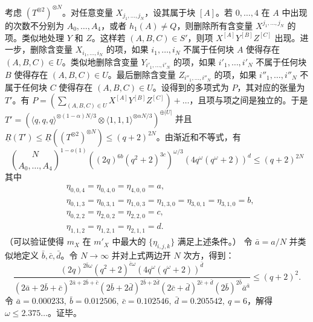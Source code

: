 \documentclass[11pt,fleqn, UTF8]{ctexbook} %
\begin{document}
考虑 $\left(T^{\otimes 2}\right)^{\otimes N}$。对任意变量 $X_{j_1,\dots,j_N}$，设其属于块 $[A]$。若 $0,\dots,4$ 在 $A$ 中出现的次数不分别为 $A_0,\dots,A_4$，或者 $h_1(A)\neq Q$，则删除所有含变量 $X^{j_1,\dots,j_N}$ 的项。类似地处理 $Y$ 和 $Z$。这样若 $(A,B,C)\in S'$，则项 $X^{[A]}Y^{[B]}Z^{[C]}$ 出现。进一步，删除含变量 $X_{i_1,\dots,i_N}$ 的项，如果 ${i_1,\dots,i_N}$ 不属于任何块 $A$ 使得存在 $(A,B,C)\in U$。类似地删除含变量 $Y_{i'_1,\dots,i'_N}$ 的项，如果 ${i'_1,\dots,i'_N}$ 不属于任何块 $B$ 使得存在 $(A,B,C)\in U$。最后删除含变量 $Z_{i''_1,\dots,i''_N}$ 的项，如果 ${i''_1,\dots,i''_N}$ 不属于任何块 $C$ 使得存在 $(A,B,C)\in U$。设得到的多项式为 $P$，其对应的张量为 $T'$。有 $P=\left(\sum_{(A,B,C)\in U} X^{[A]}Y^{[B]}Z^{[C]}\right)+\dots$，且项与项之间是独立的。于是 $T'=\left(\langle q,q,q\rangle^{\otimes (1-\alpha)N/3}\otimes \langle 1,1,1\rangle^{\otimes \alpha N/3}\right)^{\oplus |U|}$ 并且 $\underline{R}(T')\leq \underline{R}\left(\left(T^{\otimes 2}\right)^{\otimes N}\right)\leq (q+2)^{2N}$。由渐近和不等式，有
$$
{N\choose A_0,\dots,A_4}^{1-o(1)}\left((2q)^{6b}(q^2+2)^{3c}\right)^{\omega/3}(4q^\omega(q^\omega+2))^d \leq (q+2)^{2N}
$$
其中
\begin{align}
&\eta_{0,0,4}=\eta_{0,4,0}=\eta_{4,0,0}=a,\\
&\eta_{0,1,3}=\eta_{0,3,1}=\eta_{1,0,3}=\eta_{1,3,0}=\eta_{3,0,1}=\eta_{3,1,0}=b,\\
&\eta_{0,2,2}=\eta_{2,0,2}=\eta_{2,2,0}=c,\\
&\eta_{1,1,2}=\eta_{1,2,1}=\eta_{2,1,1}=d.
\end{align}
（可以验证使得 $m_X$ 在 $m'_X$ 中最大的 $\{\eta_{i,j,k}\}$ 满足上述条件。）
令 $\bar{a}=a/N$ 并类似地定义 $\bar{b},\bar{c},\bar{d}$。令 $N\to\infty$ 并对上式两边开 $N$ 次方，得到：
$$
\frac{(2q)^{2\bar{b}\omega}(q^2+2)^{\bar{c}\omega}(4q^\omega(q^\omega+2))^{\bar{d}}}
{(2\bar{a}+2\bar{b}+\bar{c})^{2\bar{a}+2\bar{b}+\bar{c}}
(2\bar{b}+2\bar{d})^{2\bar{b}+2\bar{d}}(2\bar{c}+\bar{d})^{2\bar{c}+\bar{d}}(2\bar{b})^{2\bar{b}}\bar{a}^{\bar{a}}}
\leq (q+2)^2.
$$
令 $\bar{a}=0.000233, ~\bar{b}=0.012506, ~\bar{c}=0.102546, ~\bar{d}=0.205542, ~q=6$，解得 $\omega\leq 2.375\dots$。证毕。
\end{document}
